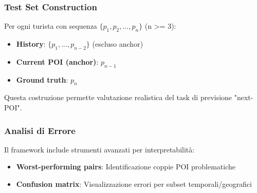 \subsubsection{Test Set Construction}

Per ogni turista con sequenza $\{p_1, p_2, ..., p_n\}$ (n >= 3):
\begin{itemize}
\item \textbf{History}: $\{p_1, ..., p_{n-2}\}$ (escluso anchor)
\item \textbf{Current POI (anchor)}: $p_{n-1}$ 
\item \textbf{Ground truth}: $p_n$
\end{itemize}

Questa costruzione permette valutazione realistica del task di previsione "next-POI".

\subsubsection{Analisi di Errore}

Il framework include strumenti avanzati per interpretabilità:
\begin{itemize}
\item \textbf{Worst-performing pairs}: Identificazione coppie POI problematiche
\item \textbf{Confusion matrix}: Visualizzazione errori per subset temporali/geografici  
\end{itemize}